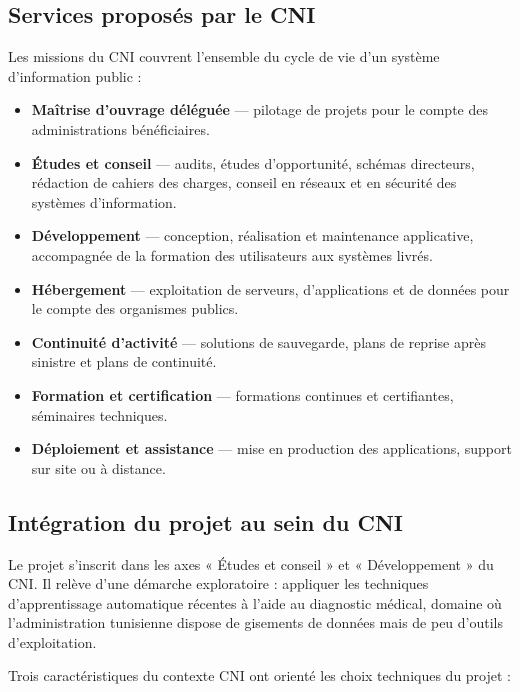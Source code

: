 \subsection{Services proposés par le CNI}

Les missions du CNI couvrent l'ensemble du cycle de vie d'un système d'information
public :

\begin{itemize}[itemsep=2pt,topsep=4pt]
  \item \textbf{Maîtrise d'ouvrage déléguée} --- pilotage de projets pour le compte
        des administrations bénéficiaires.
  \item \textbf{Études et conseil} --- audits, études d'opportunité, schémas
        directeurs, rédaction de cahiers des charges, conseil en réseaux et en sécurité
        des systèmes d'information.
  \item \textbf{Développement} --- conception, réalisation et maintenance applicative,
        accompagnée de la formation des utilisateurs aux systèmes livrés.
  \item \textbf{Hébergement} --- exploitation de serveurs, d'applications et de données
        pour le compte des organismes publics.
  \item \textbf{Continuité d'activité} --- solutions de sauvegarde, plans de reprise
        après sinistre et plans de continuité.
  \item \textbf{Formation et certification} --- formations continues et certifiantes,
        séminaires techniques.
  \item \textbf{Déploiement et assistance} --- mise en production des applications,
        support sur site ou à distance.
\end{itemize}

\subsection{Intégration du projet au sein du CNI}

Le projet \hypnoria{} s'inscrit dans les axes « Études et conseil » et
« Développement » du CNI. Il relève d'une démarche exploratoire : appliquer les
techniques d'apprentissage automatique récentes à l'aide au diagnostic médical, domaine
où l'administration tunisienne dispose de gisements de données mais de peu d'outils
d'exploitation.

Trois caractéristiques du contexte CNI ont orienté les choix techniques du projet :

